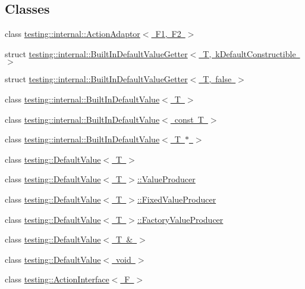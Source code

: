\subsection*{Classes}
\begin{DoxyCompactItemize}
\item 
class \mbox{\hyperlink{classtesting_1_1internal_1_1_action_adaptor}{testing\+::internal\+::\+Action\+Adaptor$<$ F1, F2 $>$}}
\item 
struct \mbox{\hyperlink{structtesting_1_1internal_1_1_built_in_default_value_getter}{testing\+::internal\+::\+Built\+In\+Default\+Value\+Getter$<$ T, k\+Default\+Constructible $>$}}
\item 
struct \mbox{\hyperlink{structtesting_1_1internal_1_1_built_in_default_value_getter_3_01_t_00_01false_01_4}{testing\+::internal\+::\+Built\+In\+Default\+Value\+Getter$<$ T, false $>$}}
\item 
class \mbox{\hyperlink{classtesting_1_1internal_1_1_built_in_default_value}{testing\+::internal\+::\+Built\+In\+Default\+Value$<$ T $>$}}
\item 
class \mbox{\hyperlink{classtesting_1_1internal_1_1_built_in_default_value_3_01const_01_t_01_4}{testing\+::internal\+::\+Built\+In\+Default\+Value$<$ const T $>$}}
\item 
class \mbox{\hyperlink{classtesting_1_1internal_1_1_built_in_default_value_3_01_t_01_5_01_4}{testing\+::internal\+::\+Built\+In\+Default\+Value$<$ T $\ast$ $>$}}
\item 
class \mbox{\hyperlink{classtesting_1_1_default_value}{testing\+::\+Default\+Value$<$ T $>$}}
\item 
class \mbox{\hyperlink{classtesting_1_1_default_value_1_1_value_producer}{testing\+::\+Default\+Value$<$ T $>$\+::\+Value\+Producer}}
\item 
class \mbox{\hyperlink{classtesting_1_1_default_value_1_1_fixed_value_producer}{testing\+::\+Default\+Value$<$ T $>$\+::\+Fixed\+Value\+Producer}}
\item 
class \mbox{\hyperlink{classtesting_1_1_default_value_1_1_factory_value_producer}{testing\+::\+Default\+Value$<$ T $>$\+::\+Factory\+Value\+Producer}}
\item 
class \mbox{\hyperlink{classtesting_1_1_default_value_3_01_t_01_6_01_4}{testing\+::\+Default\+Value$<$ T \& $>$}}
\item 
class \mbox{\hyperlink{classtesting_1_1_default_value_3_01void_01_4}{testing\+::\+Default\+Value$<$ void $>$}}
\item 
class \mbox{\hyperlink{classtesting_1_1_action_interface}{testing\+::\+Action\+Interface$<$ F $>$}}

\end{DoxyCompactItemize}
